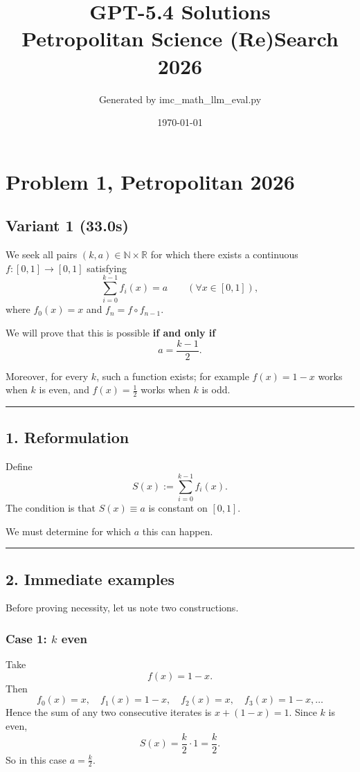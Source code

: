 \documentclass[12pt,a4paper]{article}
\title{GPT-5.4 Solutions\\Petropolitan Science (Re)Search 2026}
\author{Generated by imc\_math\_llm\_eval.py}
\date{\today}
\begin{document}
\maketitle
\tableofcontents
\newpage

\section{Problem 1, Petropolitan 2026}
\subsection{Variant 1 (33.0s)}
We seek all pairs \((k,a)\in \mathbb N\times \mathbb R\) for which there exists a continuous \(f:[0,1]\to[0,1]\) satisfying
\[
\sum_{i=0}^{k-1} f_i(x)=a \qquad (\forall x\in[0,1]),
\]
where \(f_0(x)=x\) and \(f_n=f\circ f_{n-1}\).

We will prove that this is possible \textbf{if and only if}
\[
a=\frac{k-1}{2}.
\]

Moreover, for every \(k\), such a function exists; for example \(f(x)=1-x\) works when \(k\) is even, and \(f(x)=\tfrac12\) works when \(k\) is odd.


\medskip\hrule\medskip


\subsection*{1. Reformulation}

Define
\[
S(x):=\sum_{i=0}^{k-1} f_i(x).
\]
The condition is that \(S(x)\equiv a\) is constant on \([0,1]\).

We must determine for which \(a\) this can happen.


\medskip\hrule\medskip


\subsection*{2. Immediate examples}

Before proving necessity, let us note two constructions.

\subsubsection*{Case 1: \(k\) even}
Take
\[
f(x)=1-x.
\]
Then
\[
f_0(x)=x,\quad f_1(x)=1-x,\quad f_2(x)=x,\quad f_3(x)=1-x,\dots
\]
Hence the sum of any two consecutive iterates is \(x+(1-x)=1\). Since \(k\) is even,
\[
S(x)=\frac{k}{2}\cdot 1=\frac{k}{2}.
\]
So in this case \(a=\frac{k}{2}\).
\end{document}
